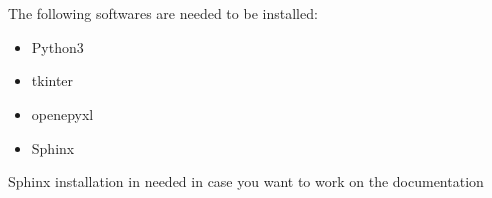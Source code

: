 \documentclass[letterpaper,10pt,english]{sphinxmanual}
\begin{document}
\chapter{}
\label{\detokenize{developer:developer-manual}}\label{\detokenize{developer::doc}}

\section{}
\label{\detokenize{developer:software-requirements}}
The following softwares are needed to be installed:
\begin{itemize}
\item {} 
Python3

\end{itemize}
\begin{itemize}
\item {} 
tkinter

\item {} 
openepyxl

\end{itemize}
\begin{itemize}
\item {} 
Sphinx

\end{itemize}

\begin{sphinxVerbatim}[commandchars=\\\{\}]
   
   
  
  
  
  
  
  
  
  
\end{sphinxVerbatim}

Sphinx installation in needed in case you want to work on the documentation

\begin{sphinxVerbatim}[commandchars=\\\{\}]
  
\end{sphinxVerbatim}
\end{document}
